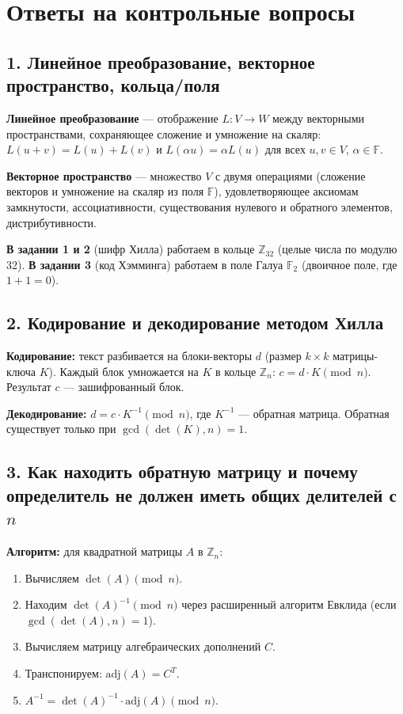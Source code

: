 \documentclass[a4paper, 12pt]{article}
\begin{document}
\section*{Ответы на контрольные вопросы}

\subsection*{1. Линейное преобразование, векторное пространство, кольца/поля}

\textbf{Линейное преобразование} — отображение $L: V \to W$ между векторными пространствами, сохраняющее сложение и умножение на скаляр: $L(u+v) = L(u)+L(v)$ и $L(\alpha u) = \alpha L(u)$ для всех $u,v \in V$, $\alpha \in \mathbb{F}$.

\textbf{Векторное пространство} — множество $V$ с двумя операциями (сложение векторов и умножение на скаляр из поля $\mathbb{F}$), удовлетворяющее аксиомам замкнутости, ассоциативности, существования нулевого и обратного элементов, дистрибутивности.

\textbf{В задании 1 и 2} (шифр Хилла) работаем в кольце $\mathbb{Z}_{32}$ (целые числа по модулю 32). \textbf{В задании 3} (код Хэмминга) работаем в поле Галуа $\mathbb{F}_2$ (двоичное поле, где $1+1=0$).

\subsection*{2. Кодирование и декодирование методом Хилла}

\textbf{Кодирование:} текст разбивается на блоки-векторы $d$ (размер $k \times k$ матрицы-ключа $K$). Каждый блок умножается на $K$ в кольце $\mathbb{Z}_n$: $c = d \cdot K \pmod{n}$. Результат $c$ — зашифрованный блок.

\textbf{Декодирование:} $d = c \cdot K^{-1} \pmod{n}$, где $K^{-1}$ — обратная матрица. Обратная существует только при $\gcd(\det(K), n) = 1$.

\subsection*{3. Как находить обратную матрицу и почему определитель не должен иметь общих делителей с $n$}

\textbf{Алгоритм:} для квадратной матрицы $A$ в $\mathbb{Z}_n$:
\begin{enumerate}
    \item Вычисляем $\det(A) \pmod{n}$.
    \item Находим $\det(A)^{-1} \pmod{n}$ через расширенный алгоритм Евклида (если $\gcd(\det(A),n)=1$).
    \item Вычисляем матрицу алгебраических дополнений $C$.
    \item Транспонируем: $\text{adj}(A) = C^T$.
    \item $A^{-1} = \det(A)^{-1} \cdot \text{adj}(A) \pmod{n}$.
\end{enumerate}
\end{document}

